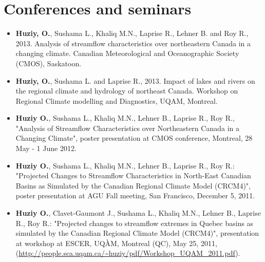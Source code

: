 \documentclass[12pt,a4paper,sans]{moderncv}
\begin{document}
\section*{Conferences and seminars}
\begin{itemize}
  
   \item \textbf{Huziy, O.}, Sushama L., Khaliq M.N., Laprise R., Lehner B. and
   Roy R., 2013. Analysis of streamflow characteristics over northeastern
   Canada in a changing climate. Canadian Meteorological and Oceanographic Society (CMOS), Saskatoon.
   
   \item \textbf{Huziy, O.}, Sushama L. and Laprise R., 2013. Impact of lakes
   and rivers on the regional climate and hydrology of northeast Canada. Workshop on Regional Climate modelling and Diagnostics, UQAM, Montreal.
  
  
    \item \textbf{Huziy O.}, Sushama L., Khaliq M.N., Lehner B., Laprise R., Roy
    R., "Analysis of Streamflow Characteristics over Northeastern Canada in a Changing Climate", poster presentation at CMOS conference, Montreal,
     28 May - 1 June 2012.
     
    \item \textbf{Huziy O.}, Sushama L., Khaliq M.N., Lehner B., Laprise R.,
    Roy R.: "Projected Changes to Streamflow Characteristics in North-East
    Canadian Basins as Simulated by the Canadian Regional Climate Model (CRCM4)", poster presentation at AGU Fall meeting, San Francisco,
    December 5, 2011.
    
    \item \textbf{Huziy O.}, Clavet-Gaumont J., Sushama L., Khaliq M.N.,
    Lehner B., Laprise R., Roy R.: "Projected changes to streamflow extremes
    in Quebec basins as simulated by the Canadian Regional Climate Model (CRCM4)", presentation at workshop at ESCER, UQÀM, Montreal (QC), May 25, 2011,
    (\url{http://people.sca.uqam.ca/~huziy/pdf/Workshop_UQAM_2011.pdf}). 
\end{itemize}
\end{document}

